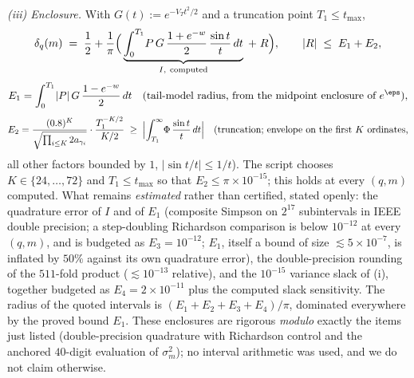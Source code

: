 \emph{(iii) Enclosure.} With $G(t):=e^{-V_Tt^2/2}$ and a truncation
point $T_1\le t_{\max}$,
\[
\delta_q(m)\;=\;\frac12+\frac1\pi\Bigl(\,
\underbrace{\int_0^{T_1}\!P\,G\,\frac{1+e^{-w}}2\,\frac{\sin t}{t}\,dt}_{I,\ \text{computed}}
\;+\;R\Bigr),
\qquad |R|\;\le\;E_1+E_2,
\]
\[
E_1=\int_0^{T_1}\!|P|\,G\,\frac{1-e^{-w}}2\,dt
\quad(\text{tail-model radius, from the midpoint enclosure of }e^{\eps}),
\]
\[
E_2=\frac{(0.8)^K}{\sqrt{\prod_{i\le K}2a_{\gamma_i}}}\cdot
\frac{T_1^{-K/2}}{K/2}
\;\ge\;\Bigl|\int_{T_1}^\infty\!\Phi\,\frac{\sin t}{t}\,dt\Bigr|
\quad(\text{truncation; envelope on the first }K\text{ ordinates,}
\]
all other factors bounded by $1$, $|\sin t/t|\le1/t$). The script
chooses $K\in\{24,\dots,72\}$ and $T_1\le t_{\max}$ so that
$E_2\le\pi\times10^{-15}$; this holds at every $(q,m)$ computed.
What remains \emph{estimated} rather than certified, stated openly:
the quadrature error of $I$ and of $E_1$ (composite Simpson on $2^{17}$
subintervals in IEEE double precision; a step-doubling Richardson
comparison is below $10^{-12}$ at every $(q,m)$, and is budgeted as
$E_3=10^{-12}$; $E_1$, itself a bound of size $\lesssim5\times10^{-7}$,
is inflated by $50\%$ against its own quadrature error), the
double-precision rounding of the $511$-fold product ($\lesssim10^{-13}$
relative), and the $10^{-15}$ variance slack of (i), together budgeted
as $E_4=2\times10^{-11}$ plus the computed slack sensitivity. The
radius of the quoted intervals is $(E_1+E_2+E_3+E_4)/\pi$, dominated
everywhere by the proved bound $E_1$. These enclosures are rigorous
\emph{modulo} exactly the items just listed (double-precision
quadrature with Richardson control and the anchored $40$-digit
evaluation of $\sigma_m^2$); no interval arithmetic was used, and we do
not claim otherwise.

